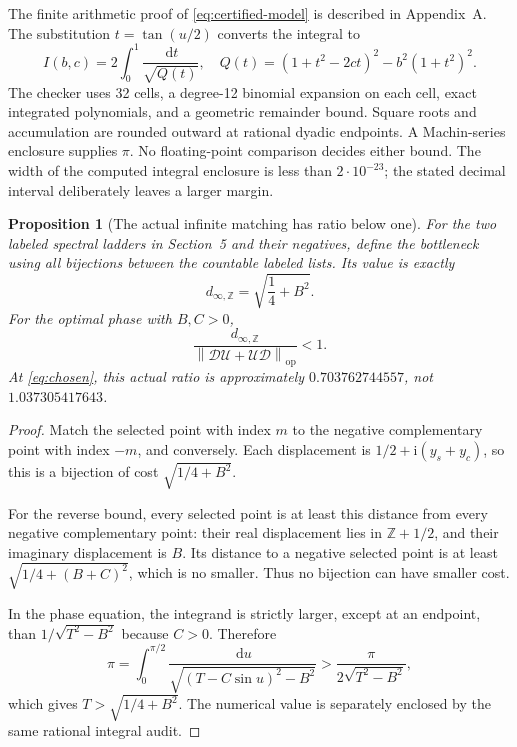 \documentclass[11pt]{article}
\newtheorem{proposition}[theorem]{Proposition}
\theoremstyle{remark}
\newcommand{\op}{\mathrm{op}}
\newcommand{\norm}[1]{\left\lVert#1\right\rVert_{\op}}
\newcommand{\dd}{\,\mathrm{d}}
\newcommand{\ii}{\mathrm{i}}
\begin{document}
The finite arithmetic proof of \eqref{eq:certified-model} is described in Appendix~A. The substitution $t=\tan(u/2)$ converts the integral to
\begin{equation}\label{eq:rational-integral}
 I(b,c)=2\int_0^1\frac{\dd t}{\sqrt{Q(t)}},\quad
 Q(t)=(1+t^2-2ct)^2-b^2(1+t^2)^2.
\end{equation}
The checker uses 32 cells, a degree-12 binomial expansion on each cell, exact integrated polynomials, and a geometric remainder bound. Square roots and accumulation are rounded outward at rational dyadic endpoints. A Machin-series enclosure supplies $\pi$. No floating-point comparison decides either bound. The width of the computed integral enclosure is less than $2\cdot10^{-23}$; the stated decimal interval deliberately leaves a larger margin.

\begin{proposition}[The actual infinite matching has ratio below one]\label{prop:actual-matching}
For the two labeled spectral ladders in Section~5 and their negatives, define the bottleneck using all bijections between the countable labeled lists. Its value is exactly
\begin{equation}\label{eq:actual-distance}
 d_{\infty,\mathbb Z}=\sqrt{\frac14+B^2}.
\end{equation}
For the optimal phase with $B,C>0$,
\[
 \frac{d_{\infty,\mathbb Z}}{\norm{\mathcal D\mathcal U+\mathcal U\mathcal D}}
 <1.
\]
At \eqref{eq:chosen}, this actual ratio is approximately $0.703762744557$, not $1.037305417643$.
\end{proposition}
\begin{proof}
Match the selected point with index $m$ to the negative complementary point with index $-m$, and conversely. Each displacement is $1/2+\ii(y_s+y_c)$, so this is a bijection of cost $\sqrt{1/4+B^2}$.

For the reverse bound, every selected point is at least this distance from every negative complementary point: their real displacement lies in $\mathbb Z+1/2$, and their imaginary displacement is $B$. Its distance to a negative selected point is at least $\sqrt{1/4+(B+C)^2}$, which is no smaller. Thus no bijection can have smaller cost.

In the phase equation, the integrand is strictly larger, except at an endpoint, than $1/\sqrt{T^2-B^2}$ because $C>0$. Therefore
\[
 \pi=\int_0^{\pi/2}\frac{\dd u}{\sqrt{(T-C\sin u)^2-B^2}}
 >\frac{\pi}{2\sqrt{T^2-B^2}},
\]
which gives $T>\sqrt{1/4+B^2}$. The numerical value is separately enclosed by the same rational integral audit.
\end{proof}
\end{document}
